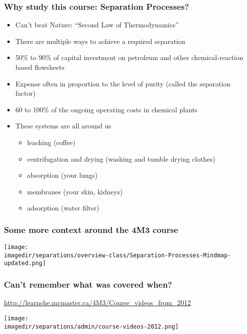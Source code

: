 \begin{frame}\frametitle{Why study this course: Separation Processes?}
	\begin{itemize}
		\item	Can't beat Nature: ``Second Law of Thermodynamics''
		\item	There are multiple ways to achieve a required separation
		\item	50\% to 90\% of capital investment on petroleum and other chemical-reaction based flowsheets 
		\item	Expense often in proportion to the level of purity (called the separation factor) %
		\item	60 to 100\% of the ongoing operating costs in chemical plants  %
		\item	These systems are all around us
		\begin{itemize}
			\item	leaching (coffee)
			\item	centrifugation and drying (washing and tumble drying clothes)
			\item	absorption (your lungs)
			\item	membranes (your skin, kidneys)
			\item	adsorption (water filter)
		\end{itemize}
	\end{itemize}
\end{frame}

\begin{frame}\frametitle{Some more context around the 4M3 course}
	\begin{center}
		\texttt{[image: \\imagedir/separations/overview-class/Separation-Processes-Mindmap-updated.png]}
	\end{center}
\end{frame}

\begin{frame}\frametitle{Can't remember what was covered when?}
	\begin{exampleblock}{}
		\href{http://learnche.mcmaster.ca/4M3/Course\_videos\_from\_2012}{http://learnche.mcmaster.ca/4M3/Course\_videos\_from\_2012}
	\end{exampleblock}
	\begin{center}
		\texttt{[image: \\imagedir/separations/admin/course-videos-2012.png]}
	\end{center}
\end{frame}

